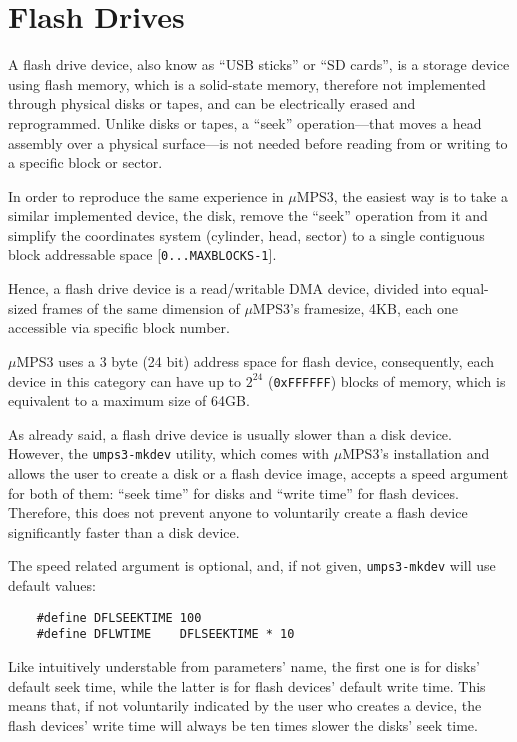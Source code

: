 \documentclass[12pt,a4paper,openright,twoside]{report}
\begin{document}
\section{Flash Drives}
	A flash drive device, also know as ``USB sticks'' or ``SD cards'', is a storage device using flash memory, which is a solid-state memory, therefore not implemented through physical disks or tapes, and can be electrically erased and reprogrammed.
	Unlike disks or tapes, a ``seek'' operation---that moves a head assembly over a physical surface---is not needed before reading from or writing to a specific block or sector.

	In order to reproduce the same experience in $\mu$MPS3, the easiest way is to take a similar implemented device, the disk, remove the ``seek'' operation from it and simplify the coordinates system (cylinder, head, sector) to a single contiguous block addressable space [\texttt{0...MAXBLOCKS-1}].

	Hence, a flash drive device is a read/writable DMA device, divided into equal-sized frames of the same dimension of $\mu$MPS3's framesize, 4KB, each one accessible via specific block number.

	$\mu$MPS3 uses a 3 byte (24 bit) address space for flash device, consequently, each device in this category can have up to $2^{24}$ (\texttt{0xFFFFFF}) blocks of memory, which is equivalent to a maximum size of 64GB. 

	As already said, a flash drive device is usually slower than a disk device.
	However, the \texttt{umps3-mkdev} utility, which comes with $\mu$MPS3's installation and allows the user to create a disk or a flash device image, accepts a speed argument for both of them: ``seek time'' for disks and ``write time'' for flash devices. Therefore, this does not prevent anyone to voluntarily create a flash device significantly faster than a disk device.

	The speed related argument is optional, and, if not given, \texttt{umps3-mkdev} will use default values:
	\begin{verbatim}
	#define DFLSEEKTIME 100
	#define DFLWTIME    DFLSEEKTIME * 10
	\end{verbatim}
	Like intuitively understable from parameters' name, the first one is for disks' default seek time, while the latter is for flash devices' default write time. This means that, if not voluntarily indicated by the user who creates a device, the flash devices' write time will always be ten times slower the disks' seek time.
	
\end{document}
